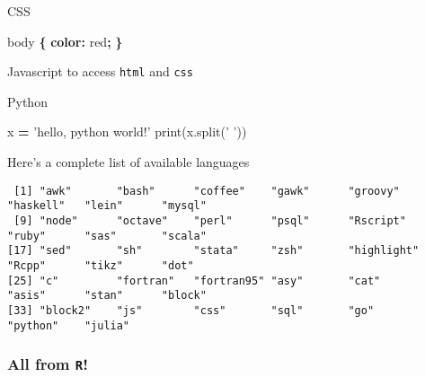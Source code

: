 \documentclass[10,portrait]{article}
\newenvironment{Shaded}{\begin{snugshade}}{\end{snugshade}}
\newcommand{\KeywordTok}[1]{\textcolor[rgb]{0.13,0.29,0.53}{\textbf{#1}}}
\newcommand{\DataTypeTok}[1]{\textcolor[rgb]{0.13,0.29,0.53}{#1}}
\newcommand{\StringTok}[1]{\textcolor[rgb]{0.31,0.60,0.02}{#1}}
\newcommand{\OperatorTok}[1]{\textcolor[rgb]{0.81,0.36,0.00}{\textbf{#1}}}
\newcommand{\BuiltInTok}[1]{#1}
\newcommand{\AttributeTok}[1]{\textcolor[rgb]{0.77,0.63,0.00}{#1}}
\newcommand{\NormalTok}[1]{#1}
\begin{document}
CSS

\begin{Shaded}
\begin{Highlighting}[]
\NormalTok{body }\KeywordTok{\{}
  \KeywordTok{color:} \DataTypeTok{red}\KeywordTok{;}
\KeywordTok{\}}
\end{Highlighting}
\end{Shaded}

Javascript to access \texttt{html} and \texttt{css}

\begin{Shaded}
\end{Shaded}

Python

\begin{Shaded}
\begin{Highlighting}[]
\NormalTok{x }\OperatorTok{=} \StringTok{'hello, python world!'}
\BuiltInTok{print}\NormalTok{(x.split(}\StringTok{' '}\NormalTok{))}
\end{Highlighting}
\end{Shaded}

Here's a complete list of available languages

\begin{Shaded}
\end{Shaded}

\begin{verbatim}
 [1] "awk"       "bash"      "coffee"    "gawk"      "groovy"    "haskell"   "lein"      "mysql"    
 [9] "node"      "octave"    "perl"      "psql"      "Rscript"   "ruby"      "sas"       "scala"    
[17] "sed"       "sh"        "stata"     "zsh"       "highlight" "Rcpp"      "tikz"      "dot"      
[25] "c"         "fortran"   "fortran95" "asy"       "cat"       "asis"      "stan"      "block"    
[33] "block2"    "js"        "css"       "sql"       "go"        "python"    "julia"    
\end{verbatim}

\subsubsection{\texorpdfstring{All from
\texttt{R}!}{All from R!}}\label{all-from-r}

\printbibliography
\end{document}
